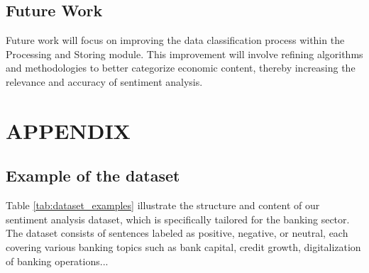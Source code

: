{\subsection{Future Work}
Future work will focus on improving the data classification process within the Processing and Storing module. This improvement will involve refining algorithms and methodologies to better categorize economic content, thereby increasing the relevance and accuracy of sentiment analysis.

\section*{APPENDIX}

\appendix
\subsection{Example of the dataset}\label{app:dataset}
Table \ref{tab:dataset_examples} illustrate the structure and content of our sentiment analysis dataset, which is specifically tailored for the banking sector. The dataset consists of sentences labeled as positive, negative, or neutral, each covering various banking topics such as bank capital, credit growth, digitalization of banking operations...

}
